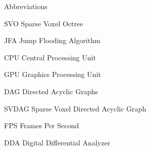 \begin{dictionary}{Abbreviations}
    \item[SVO] Sparse Voxel Octree
    \item[JFA] Jump Flooding Algorithm
    \item[CPU] Central Processing Unit
    \item[GPU] Graphics Processing Unit
    \item[DAG] Directed Acyclic Graphs
    \item[SVDAG] Sparse Voxel Directed Acyclic Graph
    \item[FPS] Frames Per Second
    \item[DDA] Digital Differential Analyzer
\end{dictionary}
